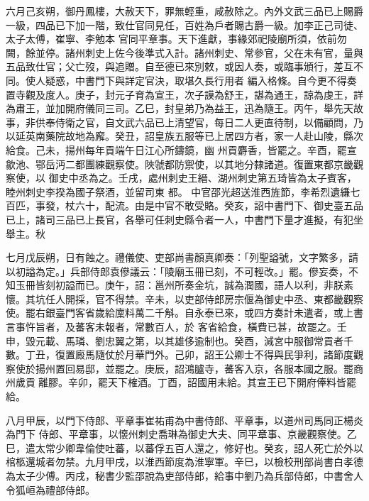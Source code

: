 \begin{pinyinscope}
 六月己亥朔，御丹鳳樓，大赦天下，罪無輕重，咸赦除之。內外文武三品已上賜爵一級，四品已下加一階，致仕官同見任，百姓為戶者賜古爵一級。加李正己司徒、太子太傅，崔寧、李勉本
 官同平章事。天下進獻，事緣郊祀陵廟所須，依前勿闕，餘並停。諸州刺史上佐今後準式入計。諸州刺史、常參官，父在未有官，量與五品致仕官；父亡歿，與追贈。自至德已來別敕，或因人奏，或臨事頒行，差互不同。使人疑惑，中書門下與詳定官決，取堪久長行用者
 編入格條。自今更不得奏置寺觀及度人。庚子，封元子育為宣王，次子謨為舒王，諶為通王，諒為虔王，詳為肅王，並加開府儀同三司。乙巳，封皇弟乃為益王，迅為隨王。丙午，舉先天故事，非供奉侍衛之官，自文武六品已上清望官，每日二人更直待制，以備顧問，乃以延英南藥院故地為廨。癸丑，詔皇族五服等已上居四方者，家一人赴山陵，縣次給食。己未，揚州每年貢端午日江心所鑄鏡，幽
 州貢麝香，皆罷之。辛酉，罷宣歙池、鄂岳沔二都團練觀察使。陜虢都防禦使，以其地分隸諸道。復置東都京畿觀察使，以
 御史中丞為之。壬戌，處州刺史王縉、湖州刺史第五琦皆為太子賓客，睦州刺史李揆為國子祭酒，並留司東
 都。
 中官邵光超送淮西旌節，李希烈遺縑七百匹，事發，杖六十，配流。由是中官不敢受賂。癸亥，詔中書門下、御史臺五品已上，諸司三品已上長官，各舉可任刺史縣令者一人，中書門下量才進擬，有犯坐
 舉主。秋



 七月戊辰朔，日有蝕之。禮儀使、吏部尚書顏真卿奏：「列聖謚號，文字繁多，請以初謚為定。」兵部侍郎袁傪議云：「陵廟玉冊已刻，不可輕改。」罷。傪妄奏，不知玉冊皆刻初謚而已。庚午，詔：邕州所奏金坑，誠為潤國，語人以利，非朕素懷。其坑任人開採，官不得禁。辛未，以吏部侍郎房宗偃為御史中丞、東都畿觀察使。罷右銀臺門客省歲給廩料萬二千斛。自永泰已來，或四方奏計未遣者，或上書言事忤旨者，及蕃客未報者，常數百人，於
 客省給食，橫費已甚，故罷之。壬申，毀元載、馬璘、劉忠翼之第，以其雄侈逾制也。癸酉，減宮中服御常貢者千數。丁丑，復置廄馬隨仗於月華門外。己卯，詔王公卿士不得與民爭利，諸節度觀察使於揚州置回易邸，並罷之。庚辰，詔鴻臚寺，蕃客入京，各服本國之服。罷商州歲貢離膠。辛卯，罷天下榷酒。丁酉，詔國用未給。其宣王已下開府俸料皆罷給。



 八月甲辰，以門下侍郎、平章事崔祐甫為中書侍郎、平章事，以道州司馬同正楊炎為門下
 侍郎、平章事，以懷州刺史喬琳為御史大夫、同平章事、京畿觀察使。乙巳，遣太常少卿韋倫使吐蕃，以蕃俘五百人還之，修好也。癸亥，詔人死亡於外以棺柩還城者勿禁。九月甲戌，以淮西節度為淮寧軍。辛巳，以檢校刑部尚書白孝德為太子少傅。丙戌，秘書少監邵說為吏部侍郎，給事中劉乃為兵部侍郎，中書舍人令狐峘為禮部侍郎。




\end{pinyinscope}
